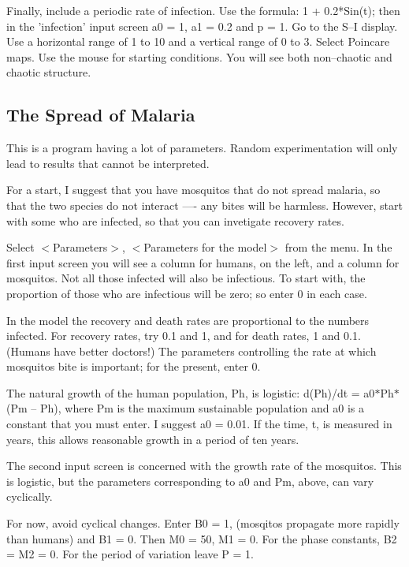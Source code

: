    Finally, include a periodic rate of infection. Use the formula:
                          1 + 0.2*Sin(t);
then in the 'infection' input screen a0 = 1, a1 = 0.2 and p = 1.
Go to the S--I display. Use a horizontal range of 1 to 10 and a vertical
range of 0 to 3. Select Poincare maps. Use the mouse for starting
conditions. You will see both non--chaotic and chaotic structure.



\subsection{The Spread of Malaria}

   This is a program having a lot of parameters. Random experimentation
will only lead to results that cannot be interpreted.

   For a start, I suggest that you have mosquitos that do not spread
malaria, so that the two species do not interact ---- any bites will
be harmless. However, start with some who are infected, so that you
can invetigate recovery rates.

   Select $<$Parameters$>$, $<$Parameters for the model$>$ from the menu. In
the first input screen you will see a column for humans, on the left,
and a column for mosquitos. Not all those infected will also be
infectious. To start with, the proportion of those who are infectious
will be zero; so enter 0 in each case.

   In the model the recovery and death rates are proportional to the
numbers infected. For recovery rates, try 0.1 and 1, and for death
rates, 1 and 0.1. (Humans have better doctors!) The parameters
controlling the rate at which mosquitos bite is important; for the
present, enter 0.

   The natural growth of the human population, Ph, is logistic:
            d(Ph)/dt = a0$*$Ph$*$(Pm -- Ph),
where Pm is the maximum sustainable population and a0 is a constant
that you must enter. I suggest a0 = 0.01. If the time, t, is measured
in years, this allows reasonable growth in a period of ten years.

   The second input screen is concerned with the growth rate of the
mosquitos. This is logistic, but the parameters corresponding to
a0 and Pm, above, can vary cyclically.

   For now, avoid cyclical changes. Enter B0 = 1, (mosqitos propagate
more rapidly than humans) and B1 = 0. Then M0 = 50, M1 = 0. For the
phase constants, B2 = M2 = 0. For the period of variation leave P = 1.


